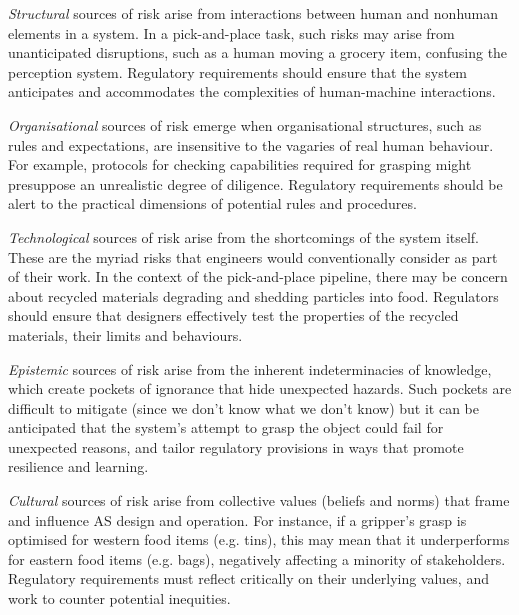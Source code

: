 \documentclass[letterpaper, 10 pt, conference]{ieeeconf}  %
\begin{document}
	\emph{Structural} sources of risk arise from interactions between human and nonhuman elements in a system.
	In a pick-and-place task, such risks may arise from unanticipated disruptions, such as a human moving a grocery item, confusing the perception system. Regulatory requirements should ensure that the system anticipates and accommodates the complexities of human-machine interactions.
	
	\emph{Organisational} sources of risk emerge when organisational structures, such as rules and expectations, are insensitive to the vagaries of real human behaviour. For example, protocols for checking capabilities required for grasping might presuppose an unrealistic degree of diligence. Regulatory requirements should be alert to the practical dimensions of potential rules and procedures.
	
	\emph{Technological} sources of risk arise from the shortcomings of the system itself. These are the myriad risks that engineers would conventionally consider as part of their work. In the context of the pick-and-place pipeline, there may be concern about recycled materials degrading and shedding particles into food. Regulators should ensure that designers effectively test the properties of the recycled materials, their limits and behaviours.
	
	\emph{Epistemic} sources of risk arise from the inherent indeterminacies of knowledge, which create pockets of ignorance that hide unexpected hazards. Such pockets are difficult to mitigate (since we don't know what we don't know) but it can be anticipated that the system's attempt to grasp the object could fail for unexpected reasons, and tailor regulatory provisions in ways that promote resilience and learning. 
	
	\emph{Cultural} sources of risk arise from collective values (beliefs and norms) that frame and influence AS design and operation. For instance, if a gripper's grasp is optimised for western food items (e.g. tins), this may mean that it underperforms for eastern food items (e.g. bags), negatively affecting a minority of stakeholders. Regulatory requirements must reflect critically on their underlying values, and work to counter potential inequities. 
	
\end{document}
